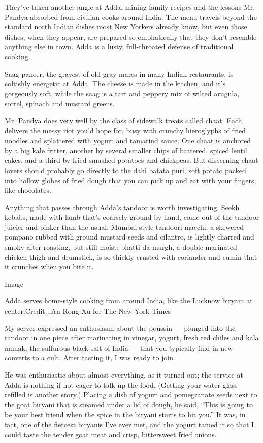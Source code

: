 They've taken another angle at Adda, mining family recipes and the
lessons Mr. Pandya absorbed from civilian cooks around India. The menu
travels beyond the standard north Indian dishes most New Yorkers already
know, but even those dishes, when they appear, are prepared so
emphatically that they don't resemble anything else in town. Adda is a
lusty, full-throated defense of traditional cooking.

Saag paneer, the grayest of old gray mares in many Indian restaurants,
is coltishly energetic at Adda. The cheese is made in the kitchen, and
it's gorgeously soft, while the saag is a tart and peppery mix of wilted
arugula, sorrel, spinach and mustard greens.

Mr. Pandya does very well by the class of sidewalk treats called chaat.
Each delivers the messy riot you'd hope for, busy with crunchy
hieroglyphs of fried noodles and splattered with yogurt and tamarind
sauce. One chaat is anchored by a big kale fritter, another by several
smaller chips of battered, spiced lentil cakes, and a third by fried
smashed potatoes and chickpeas. But discerning chaat lovers should
probably go directly to the dahi batata puri, soft potato packed into
hollow globes of fried dough that you can pick up and eat with your
fingers, like chocolates.

Anything that passes through Adda's tandoor is worth investigating.
Seekh kebabs, made with lamb that's coarsely ground by hand, come out of
the tandoor juicier and pinker than the usual; Mumbai-style tandoori
macchi, a skewered pompano rubbed with ground mustard seeds and
cilantro, is lightly charred and smoky after roasting, but still moist;
bhatti da murgh, a double-marinated chicken thigh and drumstick, is so
thickly crusted with coriander and cumin that it crunches when you bite
it.

Image

Adda serves home-style cooking from around India, like the Lucknow
biryani at center.Credit...An Rong Xu for The New York Times

My server expressed an enthusiasm about the poussin --- plunged into the
tandoor in one piece after marinating in vinegar, yogurt, fresh red
chiles and kala namak, the sulfurous black salt of India --- that you
typically find in new converts to a cult. After tasting it, I was ready
to join.

He was enthusiastic about almost everything, as it turned out; the
service at Adda is nothing if not eager to talk up the food. (Getting
your water glass refilled is another story.) Placing a dish of yogurt
and pomegranate seeds next to the goat biryani that is steamed under a
lid of dough, he said, ``This is going to be your best friend when the
spice in the biryani starts to hit you.'' It was, in fact, one of the
fiercest biryanis I've ever met, and the yogurt tamed it so that I could
taste the tender goat meat and crisp, bittersweet fried onions.

